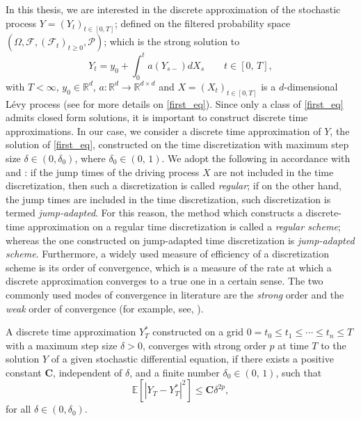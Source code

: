In this thesis, we are interested in the discrete approximation of the stochastic process \break $Y=(Y_t)_{t \in [0, T]}$; defined on the filtered probability space $(\Omega , \mathcal{F}, (\mathcal{F}_t)_{t \geq 0}, \mathcal{P})$; which is the strong solution to
\begin{equation}\label{first_eq}
      Y_t = y_0  + \int_0^t a(Y_{s-})dX_s \qquad t \in [0, \, T],
\end{equation}
with $T < \infty$, $y_0  \in \mathbb{R}^d$, $a : \mathbb{R}^d \to \mathbb{R}^{d \times d}$ and $X=(X_t)_{t\in [0,T]}$ is a $d$-dimensional L\'evy process (see  for more details on \eqref{first_eq}). Since only a class of \eqref{first_eq} admits closed form solutions, it is important to construct discrete time  approximations. In our case, we consider a discrete time  approximation of $Y$, the solution of \eqref{first_eq}, constructed on the time discretization with maximum step size $\delta \in (0, \delta_0)$, where $\delta_0 \in (0, \, 1)$. We adopt the following in accordance with  and : if the jump times of the driving process $X$ are not included in the time discretization, then such a discretization is called \emph{regular}; if on the other hand, the jump times are included in the time discretization, such discretization is termed \emph{jump-adapted}. For this reason, the method which constructs a discrete-time approximation on a regular time discretization is called a \emph{regular scheme}; whereas the one constructed on jump-adapted time discretization is \emph{jump-adapted scheme}. Furthermore, a widely used measure of efficiency of a discretization scheme is its order of convergence, which is a measure of the rate at which a discrete approximation converges to a true one in a certain sense. The two commonly used modes of convergence in literature are the \emph{strong} order and the \emph{weak} order of convergence (for example, see,  ).
\begin{definition}
A discrete time approximation $Y^*_{{T}}$ constructed on a grid $0 = t_0 \leq t_1 \leq \cdots \leq t_n \leq T $ with a maximum step size $\delta >0$, converges with strong order $p$ at time $T$ to the solution $Y$ of a given stochastic differential equation, if there exists a positive constant $\mathbf{C}$, independent of $\delta$, and a finite number $\delta_0 \in (0, \, 1)$, such that
\begin{equation}\label{strong_Error}
    \mathbb{E}[|Y_T - Y^*_{{T}}|^2] \leq \mathbf{C}\delta^{2p},
\end{equation}
for all $\delta \in (0, \delta_0)$.
\end{definition}
